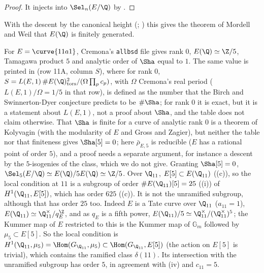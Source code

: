\begin{proof}
It injects into $\Sel_n(E/\Q)$ by .
\end{proof}

\noindent With the descent by the canonical height (; \cite[Chapter VIII]{SilvermanAEC}) this gives the theorem of Mordell and Weil that $E(\Q)$
is finitely generated.

\begin{example}[\curve{11a1} and $n=5$]\label{ex:galcoh:selmer-11a1}
For $E=\curve{11a1}$, Cremona's \texttt{allbsd} file gives rank $0$, $E(\Q)\simeq\Z/5$, Tamagawa product $5$ and analytic order of $\Sha$ equal to $1$. The same value
is printed in \cite[Table 4]{Cremona97} (row 11A, column $S$), where for rank $0$, $S=L(E,1)\,\#E(\Q)_{\mathrm{tors}}^2/(\Omega\prod_pc_p)$, with $\Omega$ Cremona's real period ($L(E,1)/\Omega=1/5$ in that row), is defined as the number that the Birch and
Swinnerton-Dyer conjecture predicts to be $\#\Sha$; for rank $0$ it is exact, but it is a statement about $L(E,1)$, not a proof about $\Sha$, and the table does not claim
otherwise. That $\Sha$ is finite for a curve of analytic rank $0$ is a theorem of Kolyvagin \cite{Kolyvagin90} (with the modularity of $E$ and Gross and Zagier), but neither the table nor that finiteness gives $\Sha[5]=0$; here $\bar\rho_{E,5}$ is
reducible ($E$ has a rational point of order $5$), and a proof needs a separate argument, for instance a descent by the $5$-isogenies of the class, which we do not give. Granting $\Sha[5]=0$,
$\Sel_5(E/\Q)\simeq E(\Q)/5E(\Q)\simeq\Z/5$. Over $\Q_{11}$, $E[5]\subset E(\Q_{11})$ ((c)), so the local condition at $11$ is a subgroup of order
$\#E(\Q_{11})[5]=25$ ((i)) of $H^1(\Q_{11},E[5])$, which has order $625$ ((c)). It is not the unramified subgroup, although that has order $25$
too. Indeed $E$ is a Tate curve over $\Q_{11}$ ($a_{11}=1$), $E(\Q_{11})\simeq\Q_{11}^\times/q_E^{\Z}$, and as $q_E$ is a fifth power,
$E(\Q_{11})/5\simeq\Q_{11}^\times/(\Q_{11}^\times)^5$; the Kummer map of $E$ restricted to this is the Kummer map of $\mathbb G_m$ followed by $\mu_5\subset E[5]$. So the local
condition is $H^1(\Q_{11},\mu_5)=\Hom(G_{\Q_{11}},\mu_5)\subset\Hom(G_{\Q_{11}},E[5])$ (the action on $E[5]$ is trivial), which contains the ramified class $\delta(11)$. Its
intersection with the unramified subgroup has order $5$, in agreement with (iv) and $c_{11}=5$.
\end{example}

